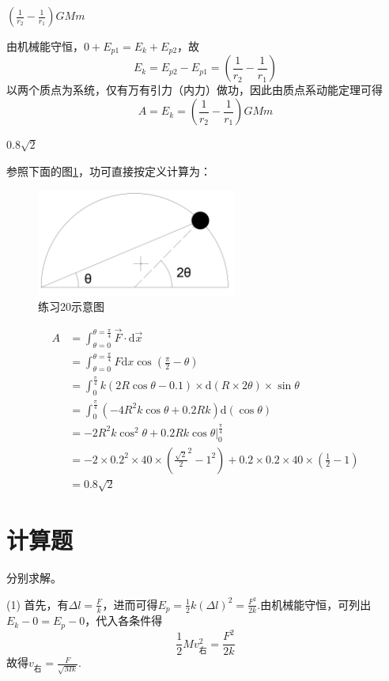 \documentclass[b5paper,opensource,sourcefont,parskip]{qyxf-book}
\newcommand{\di}[1]{\mathrm{d}#1}
\begin{document}
$\left(\frac{1}{r_2}-\frac{1}{r_1}\right)GMm$ 

\solve 由机械能守恒，$0+E_{p1}=E_k+E_{p2}$，故
\[E_k=E_{p2}-E_{p1}=\left(\frac{1}{r_2}-\frac{1}{r_1}\right)\]
以两个质点为系统，仅有万有引力（内力）做功，因此由质点系动能定理可得
\[A=E_k=\left(\frac{1}{r_2}-\frac{1}{r_1}\right)GMm\]

$0.8\sqrt{2}$

\solve 参照下面的图\ref{fig:t20}，功可直接按定义计算为：

\begin{figure}[htbp]
\centering
\includegraphics[height=100pt]{Chp2_illus1.png}
\caption{练习20示意图}\label{fig:t20}
\end{figure}

\begin{align*}
A&=\int_{\theta=0}^{\theta=\frac{\pi}{4}}{\vec{F}}\cdot\di{\vec{x}}\\
&=\int_{\theta=0}^{\theta=\frac{\pi}{4}}F\di{x}\cos\left(\frac{\pi}{2}-\theta\right)\\
&=\int_{0}^{\frac{\pi}{4}}k(2R\cos\theta-0.1)\times\di{(R\times 2\theta)}\times\sin\theta\\
&=\int_{0}^{\frac{\pi}{4}}(-4R^2k\cos\theta+0.2Rk)\di{(\cos\theta)}\\
&=-2R^2k\cos^2\theta+0.2Rk\cos\theta\left.\right|_0^{\frac{\pi}{4}}\\
&=-2\times 0.2^2\times 40\times({\frac{\sqrt{2}}{2}}^2-1^2)+0.2\times 0.2\times 40\times(\frac{1}{2}-1)\\
&=0.8\sqrt{2}
\end{align*}


\section{计算题}

\solve 分别求解。

(1) 首先，有$\Delta l=\frac{F}{k}$，进而可得$E_p=\frac{1}{2}k(\Delta l)^2=\frac{F^2}{2k}$.由机械能守恒，可列出
$E_k-0=E_p-0$，代入各条件得
\[\frac{1}{2}Mv_{\text{右}}^2=\frac{F^2}{2k}\]
故得$v_{\text{右}}=\frac{F}{\sqrt{Mk}}$.
\end{document}
